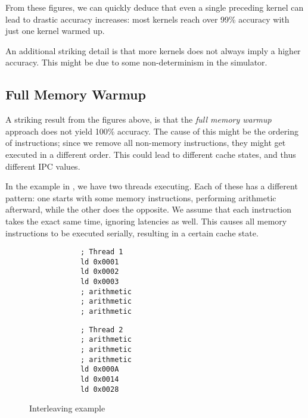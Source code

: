 From these figures, we can quickly deduce that even a single preceding kernel can lead to drastic accuracy increases: most kernels reach over 99\% accuracy with just one kernel warmed up.

An additional striking detail is that more kernels does not always imply a higher accuracy.
This might be due to some non-determinism in the simulator.

\FloatBarrier
\subsection{Full Memory Warmup}\label{subsec:full-memory-warmup}
A striking result from the figures above, is that the \textit{full memory warmup} approach does not yield 100\% accuracy.
The cause of this might be the ordering of instructions; since we remove all non-memory instructions, they might get executed in a different order.
This could lead to different cache states, and thus different IPC values.

In the example in , we have two threads executing.
Each of these has a different pattern: one starts with some memory instructions, performing arithmetic afterward, while the other does the opposite.
We assume that each instruction takes the exact same time, ignoring latencies as well.
This causes all memory instructions to be executed serially, resulting in a certain cache state.
\begin{figure}[hb]
    \centering
    \begin{minipage}[!]{0.45\textwidth}
        \begin{verbatim}
            ; Thread 1
            ld 0x0001
            ld 0x0002
            ld 0x0003
            ; arithmetic
            ; arithmetic
            ; arithmetic
        \end{verbatim}
    \end{minipage}
    \begin{minipage}[!]{0.45\textwidth}
        \begin{verbatim}
            ; Thread 2
            ; arithmetic
            ; arithmetic
            ; arithmetic
            ld 0x000A
            ld 0x0014
            ld 0x0028
        \end{verbatim}
    \end{minipage}
    \caption{Interleaving example}
    \label{fig:example2a}
\end{figure}


